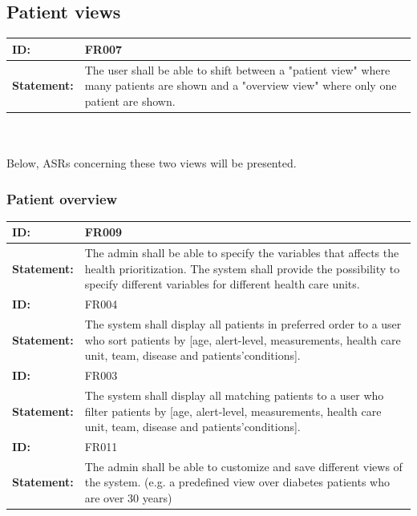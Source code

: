\documentclass{article}
\begin{document}
\subsection{Patient views}
\begin{tabularx}{\linewidth}{| l | X |}
 \hline
 \textbf{ID:} & FR007  \\ 
 \hline
 \textbf{Statement:} & The user shall be able to shift between a "patient view" where many patients are shown and a "overview view" where only one patient are shown. \\
 \hline
\end{tabularx}
\\ \\

Below, ASRs concerning these two views will be presented.

\subsubsection{Patient overview}
\begin{tabularx}{\linewidth}{| l | X |}
 \hline
 \textbf{ID:} & FR009  \\ 
 \hline
 \textbf{Statement:} & The admin shall be able to specify the variables that affects the health prioritization. The system shall provide the possibility to specify different variables for different health care units. 
 \\ 
 \hline
 
 \textbf{ID:} & FR004  \\ 
 \hline
 \textbf{Statement:} & The system shall display all patients in preferred order to a user who sort patients by [age, alert-level, measurements, health care unit, team, disease and patients’conditions]. \\ 
 \hline
 
 \textbf{ID:} & FR003  \\ 
 \hline
 \textbf{Statement:} & The system shall display all matching patients to a user who filter patients by [age, alert-level, measurements, health care unit, team, disease and patients’conditions]. \\ 
 \hline

 \textbf{ID:} & FR011  \\ 
 \hline
 \textbf{Statement:} & The admin shall be able to customize and save different views of the system. (e.g. a predefined view over diabetes patients who are over 30 years)
  \\ 
 \hline
\end{tabularx}
\\ \\
\end{document}
